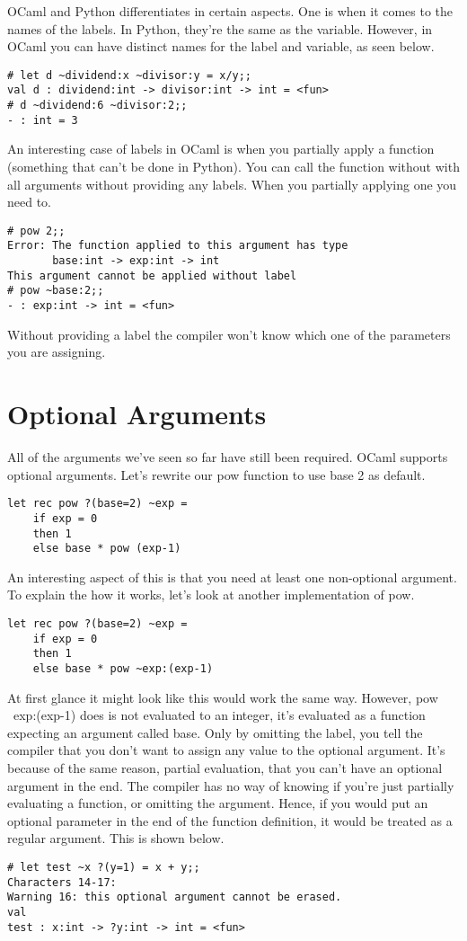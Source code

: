 \documentclass{article}
\begin{document}
OCaml and Python differentiates in certain aspects.
One is when it comes to the names of the labels.
In Python, they're the same as the variable.
However, in OCaml you can have distinct names for the label and variable, as seen below.

\begin{verbatim}
# let d ~dividend:x ~divisor:y = x/y;;
val d : dividend:int -> divisor:int -> int = <fun>
# d ~dividend:6 ~divisor:2;;
- : int = 3
\end{verbatim}

An interesting case of labels in OCaml is when you partially apply a function (something that can't be done in Python).
You can call the function without with all arguments without providing any labels.
When you partially applying one you need to.

\begin{verbatim}
# pow 2;;
Error: The function applied to this argument has type
       base:int -> exp:int -> int
This argument cannot be applied without label
# pow ~base:2;;
- : exp:int -> int = <fun>
\end{verbatim}

Without providing a label the compiler won't know which one of the parameters you are assigning.

\section{Optional Arguments}
All of the arguments we've seen so far have still been required.
OCaml supports optional arguments.
Let's rewrite our pow function to use base 2 as default.
\begin{verbatim}
let rec pow ?(base=2) ~exp =
    if exp = 0
    then 1
    else base * pow (exp-1)
\end{verbatim}

An interesting aspect of this is that you need at least one non-optional argument.
To explain the how it works, let's look at another implementation of pow.

\begin{verbatim}
let rec pow ?(base=2) ~exp =
    if exp = 0
    then 1
    else base * pow ~exp:(exp-1)
\end{verbatim}

At first glance it might look like this would work the same way.
However, pow ~exp:(exp-1) does is not evaluated to an integer, it's evaluated as a function expecting an argument called base.
Only by omitting the label, you tell the compiler that you don't want to assign any value to the optional argument.
It's because of the same reason, partial evaluation, that you can't have an optional argument in the end.
The compiler has no way of knowing if you're just partially evaluating a function, or omitting the argument.
Hence, if you would put an optional parameter in the end of the function definition, it would be treated as a regular argument.
This is shown below.
\begin{verbatim}
# let test ~x ?(y=1) = x + y;;
Characters 14-17:
Warning 16: this optional argument cannot be erased.                                                val
test : x:int -> ?y:int -> int = <fun>
\end{verbatim}
\end{document}
